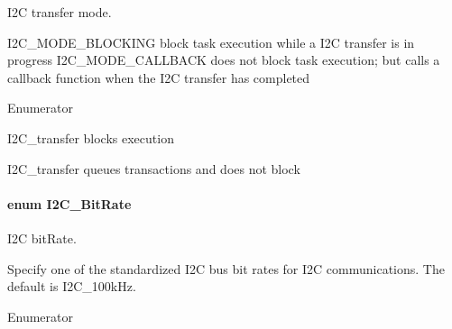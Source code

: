 I2\+C transfer mode. 

I2\+C\+\_\+\+M\+O\+D\+E\+\_\+\+B\+L\+O\+C\+K\+I\+N\+G block task execution while a I2\+C transfer is in progress I2\+C\+\_\+\+M\+O\+D\+E\+\_\+\+C\+A\+L\+L\+B\+A\+C\+K does not block task execution; but calls a callback function when the I2\+C transfer has completed \begin{Desc}
\item[Enumerator]\par
\begin{description}
\item[{\em 
I2\+C\+\_\+\+M\+O\+D\+E\+\_\+\+B\+L\+O\+C\+K\+I\+N\+G\label{_i2_c_8h_a39f3b9340fc4ee241b0d2da9b2841c26abe065350be2a0ae5c9beb24624626c75}
}]I2\+C\+\_\+transfer blocks execution \item[{\em 
I2\+C\+\_\+\+M\+O\+D\+E\+\_\+\+C\+A\+L\+L\+B\+A\+C\+K\label{_i2_c_8h_a39f3b9340fc4ee241b0d2da9b2841c26a129731a7edeb285f43a54b2cf9f5ac72}
}]I2\+C\+\_\+transfer queues transactions and does not block \end{description}
\end{Desc}
\paragraph[{I2\+C\+\_\+\+Bit\+Rate}]{\setlength{\rightskip}{0pt plus 5cm}enum {\bf I2\+C\+\_\+\+Bit\+Rate}}\label{_i2_c_8h_ac954e3197f04c50293db466c4abb6fbe}


I2\+C bit\+Rate. 

Specify one of the standardized I2\+C bus bit rates for I2\+C communications. The default is I2\+C\+\_\+100k\+Hz. \begin{Desc}
\item[Enumerator]\par
\begin{description}
\item[{\em 
I2\+C\+\_\+100k\+Hz\label{_i2_c_8h_ac954e3197f04c50293db466c4abb6fbea966fd2df13b3a9825615c50335cf1987}
}]\item[{\em 
I2\+C\+\_\+400k\+Hz\label{_i2_c_8h_ac954e3197f04c50293db466c4abb6fbea83cc3750242e6ae9194cd7ed94f764d9}
}]\end{description}
\end{Desc}



